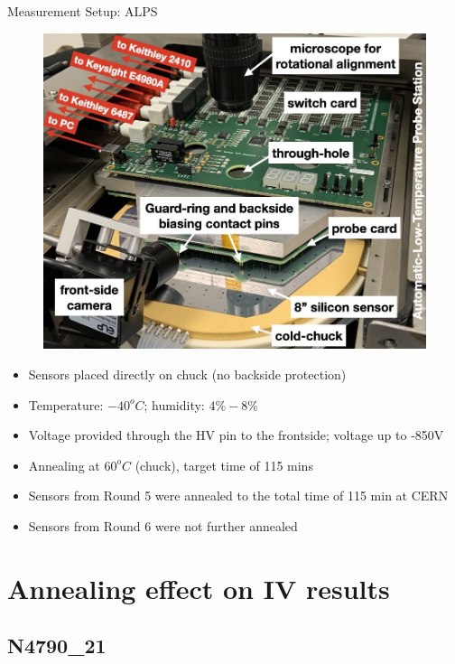 \documentclass{beamer}
\begin{document}
\begin{frame}{Measurement Setup: ALPS}
    \begin{figure}
        \includegraphics[width=.45\textwidth]{plots/ALPS_setup.png}
    \end{figure}
  
    \begin{itemize}
        \scriptsize
        \item Sensors placed directly on chuck (no backside protection)
        \item Temperature: $-40^oC$; humidity: $ 4\% - 8\%$
        \item Voltage provided through the HV pin to the frontside;  voltage up to \alert{-850V}
        \item Annealing at $60^oC$ (chuck), target time of 115 mins
        \item Sensors from Round 5 were annealed to the total time of 115 min at CERN 
        \item Sensors from Round 6 were not further annealed
    \end{itemize}
\end{frame}
  

\section{Annealing effect on IV results}

\subsection{N4790\_21}
\end{document}
